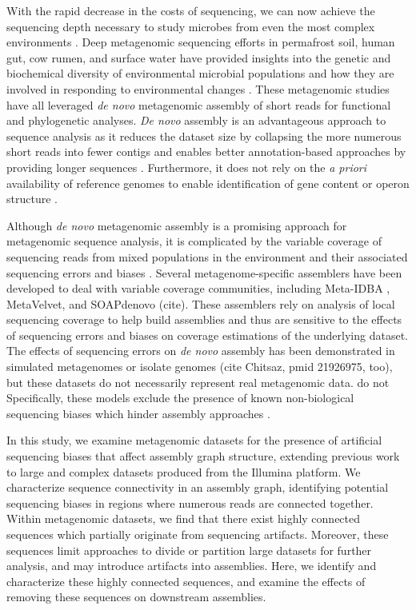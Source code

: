 \documentclass[10pt]{article}
\begin{document}
With the rapid decrease in the costs of sequencing, we can now achieve
the sequencing depth necessary to study microbes from even the most
complex environments \cite{Hess:2011p686,Qin:2010p189}.  Deep
metagenomic sequencing efforts in permafrost soil, human gut, cow
rumen, and surface water have provided insights into the genetic and
biochemical diversity of environmental microbial populations
\cite{Hess:2011p686,Iverson:2012p1281,Qin:2010p189} and how they are
involved in responding to environmental changes
\cite{Mackelprang:2011p1087}. These metagenomic studies have all
leveraged \emph{de novo} metagenomic assembly of short reads for
functional and phylogenetic analyses. \emph{De novo} assembly is an
advantageous approach to sequence analysis as it reduces the dataset
size by collapsing the more numerous short reads into fewer contigs
and enables better annotation-based approaches by providing longer
sequences \cite{Miller:2010p226,Pop:2009p798}. Furthermore, it does
not rely on the {\em a priori} availability of reference genomes to enable
identification of gene content or operon structure
\cite{Hess:2011p686,Iverson:2012p1281}.

Although \emph{de novo} metagenomic assembly is a promising approach
for metagenomic sequence analysis, it is complicated by the variable
coverage of sequencing reads from mixed populations in the environment
and their associated sequencing errors and biases
\cite{Mende:2012p1262,Pignatelli:2011p742}. Several
metagenome-specific assemblers have been developed to deal with
variable coverage communities, including Meta-IDBA
\cite{Peng:2011p898}, MetaVelvet, and SOAPdenovo (cite).  These
assemblers rely on analysis of local sequencing coverage to help build
assemblies and thus are sensitive to the effects of sequencing errors
and biases on coverage estimations of the underlying dataset. The
effects of sequencing errors on \emph{de novo} assembly has been
demonstrated in simulated metagenomes
\cite{Mavromatis:2006p894,Mende:2012p1262,Pignatelli:2011p742} or
isolate genomes \cite{Morgan:2010p740} (cite Chitsaz, pmid 21926975,
too), but these datasets do not necessarily represent real metagenomic
data. do not Specifically, these models exclude the presence of known
non-biological sequencing biases which hinder assembly approaches
\cite{GomezAlvarez:2009p1334,Keegan:2012p1336,Niu:2010p1333}.

In this study, we examine metagenomic datasets for the presence of
artificial sequencing biases that affect assembly graph structure,
extending previous work to large and complex datasets produced from
the Illumina platform. We characterize sequence connectivity in an
assembly graph, identifying potential sequencing biases in regions
where numerous reads are connected together.  Within metagenomic
datasets, we find that there exist highly connected sequences which
partially originate from sequencing artifacts.  Moreover, these
sequences limit approaches to divide or partition large datasets for
further analysis, and may introduce artifacts into assemblies.  Here,
we identify and characterize these highly connected sequences, and
examine the effects of removing these sequences on downstream
assemblies.
\end{document}
